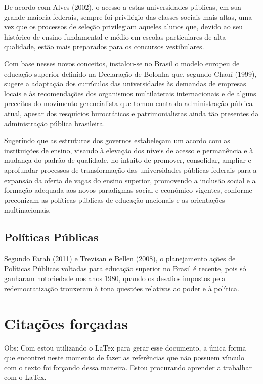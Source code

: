 De acordo com Alves (2002), o acesso a estas universidades públicas, em sua grande maioria federais, sempre foi privilégio das classes sociais mais altas, uma vez que os processos de seleção privilegiam aqueles alunos que, devido ao seu histórico de ensino fundamental e médio em escolas particulares de alta qualidade, estão mais preparados para os concursos vestibulares.

Com base nesses novos conceitos, instalou-se no Brasil o modelo europeu de educação superior definido na Declaração de Bolonha que, segundo Chauí (1999), sugere a adaptação dos currículos das universidades às demandas de empresas locais e às recomendações dos organismos multilaterais internacionais e de alguns preceitos do movimento gerencialista que tomou conta da administração pública atual, apesar dos resquícios burocráticos e patrimonialistas ainda tão presentes da administração pública brasileira.

Sugerindo que as estruturas dos governos estabeleçam um acordo com as instituições de ensino, visando à elevação dos níveis de acesso e permanência e à mudança do padrão de qualidade, no intuito de promover, consolidar, ampliar e aprofundar processos de transformação das universidades públicas federais para a expansão da oferta de vagas do ensino superior, promovendo a inclusão social e a formação adequada aos novos paradigmas social e econômico vigentes, conforme preconizam as políticas públicas de educação nacionais e as orientações multinacionais.


\subsection{Políticas Públicas}

Segundo Farah (2011) e Trevisan e Bellen (2008), o planejamento ações de Políticas Públicas voltadas para educação superior no Brasil é recente, pois só ganharam notoriedade nos anos 1980, quando os desafios impostos pela redemocratização trouxeram à tona questões relativas ao poder e à política.










\section{Citações forçadas}%
 Obs: Com estou utilizando o LaTex para gerar esse documento, a única forma que encontrei neste momento de fazer as referências que não possuem vínculo com o texto foi forçando dessa maneira. Estou procurando aprender a trabalhar com o LaTex.



